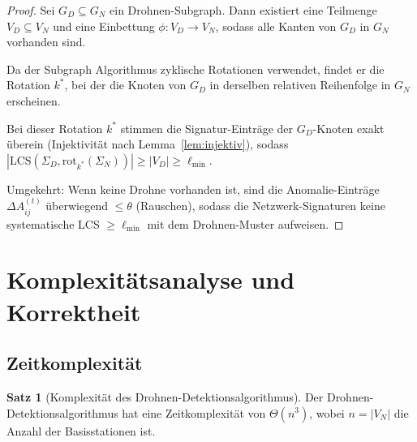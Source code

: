 ﻿\documentclass[a4paper,12pt]{article}
\theoremstyle{definition}
\newtheorem{satz}{Satz}
\begin{document}
\begin{proof}
    Sei $G_D \subseteq G_N$ ein Drohnen-Subgraph. Dann existiert eine Teilmenge
    $V_D \subseteq V_N$ und eine Einbettung $\phi: V_D \to V_N$, sodass alle
    Kanten von $G_D$ in $G_N$ vorhanden sind.

    Da der Subgraph Algorithmus zyklische Rotationen verwendet, findet er die
    Rotation $k^*$, bei der die Knoten von $G_D$ in derselben relativen Reihenfolge
    in $G_N$ erscheinen.

    Bei dieser Rotation $k^*$ stimmen die Signatur-Eintr\"age der $G_D$-Knoten
    exakt \"uberein (Injektivit\"at nach Lemma~\ref{lem:injektiv}), sodass
    $|\mathrm{LCS}(\Sigma_D, \mathrm{rot}_{k^*}(\Sigma_N))| \geq |V_D| \geq \ell_{\min}$.

    Umgekehrt: Wenn keine Drohne vorhanden ist, sind die Anomalie-Eintr\"age
    $\Delta A^{(t)}_{ij}$ \"uberwiegend $\leq \theta$ (Rauschen), sodass die
    Netzwerk-Signaturen keine systematische LCS $\geq \ell_{\min}$ mit dem
    Drohnen-Muster aufweisen.
\end{proof}

\section{Komplexit\"atsanalyse und Korrektheit}
\label{sec:analyse}

\subsection{Zeitkomplexit\"at}

\begin{satz}[Komplexit\"at des Drohnen-Detektionsalgorithmus]
\label{satz:komplex}
    Der Drohnen-Detektionsalgorithmus hat eine Zeitkomplexit\"at von $\Theta(n^3)$,
    wobei $n = |V_N|$ die Anzahl der Basisstationen ist.
\end{satz}
\end{document}
